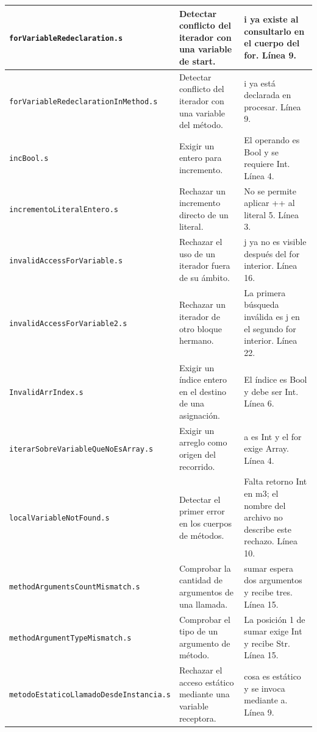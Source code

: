 \begin{longtable}{|>{\raggedright\arraybackslash}p{}|>{\raggedright\arraybackslash}p{}|>{\raggedright\arraybackslash}p{}|}
\texttt{for\allowbreak Variable\allowbreak Redeclaration.s} & Detectar conflicto del iterador con una variable de start. & i ya existe al consultarlo en el cuerpo del for. Línea 9. \\ \hline
\texttt{for\allowbreak Variable\allowbreak Redeclaration\allowbreak In\allowbreak Method.s} & Detectar conflicto del iterador con una variable del método. & i ya está declarada en procesar. Línea 9. \\ \hline
\texttt{inc\allowbreak Bool.s} & Exigir un entero para incremento. & El operando es Bool y se requiere Int. Línea 4. \\ \hline
\texttt{incremento\allowbreak Literal\allowbreak Entero.s} & Rechazar un incremento directo de un literal. & No se permite aplicar ++ al literal 5. Línea 3. \\ \hline
\texttt{invalid\allowbreak Access\allowbreak For\allowbreak Variable.s} & Rechazar el uso de un iterador fuera de su ámbito. & j ya no es visible después del for interior. Línea 16. \\ \hline
\texttt{invalid\allowbreak Access\allowbreak For\allowbreak Variable2.s} & Rechazar un iterador de otro bloque hermano. & La primera búsqueda inválida es j en el segundo for interior. Línea 22. \\ \hline
\texttt{Invalid\allowbreak Arr\allowbreak Index.s} & Exigir un índice entero en el destino de una asignación. & El índice es Bool y debe ser Int. Línea 6. \\ \hline
\texttt{iterar\allowbreak Sobre\allowbreak Variable\allowbreak Que\allowbreak No\allowbreak Es\allowbreak Array.s} & Exigir un arreglo como origen del recorrido. & a es Int y el for exige Array. Línea 4. \\ \hline
\texttt{local\allowbreak Variable\allowbreak Not\allowbreak Found.s} & Detectar el primer error en los cuerpos de métodos. & Falta retorno Int en m3; el nombre del archivo no describe este rechazo. Línea 10. \\ \hline
\texttt{method\allowbreak Arguments\allowbreak Count\allowbreak Mismatch.s} & Comprobar la cantidad de argumentos de una llamada. & sumar espera dos argumentos y recibe tres. Línea 15. \\ \hline
\texttt{method\allowbreak Argument\allowbreak Type\allowbreak Mismatch.s} & Comprobar el tipo de un argumento de método. & La posición 1 de sumar exige Int y recibe Str. Línea 15. \\ \hline
\texttt{metodo\allowbreak Estatico\allowbreak Llamado\allowbreak Desde\allowbreak Instancia.s} & Rechazar el acceso estático mediante una variable receptora. & cosa es estático y se invoca mediante a. Línea 9. \\ \hline

\end{longtable}
